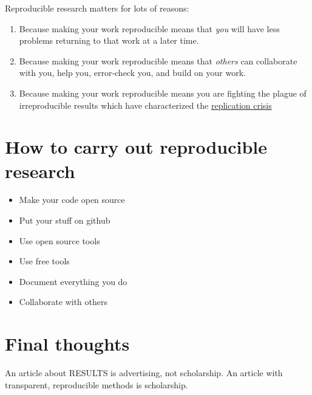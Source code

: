 \documentclass[
]{book}
\providecommand{\tightlist}{%
  \setlength{\itemsep}{0pt}\setlength{\parskip}{0pt}}
\begin{document}
Reproducible research matters for lots of reasons:

\begin{enumerate}
\def\labelenumi{\arabic{enumi}.}
\tightlist
\item
  Because making your work reproducible means that \emph{you} will have less problems returning to that work at a later time.\\
\item
  Because making your work reproducible means that \emph{others} can collaborate with you, help you, error-check you, and build on your work.\\
\item
  Because making your work reproducible means you are fighting the plague of irreproducible results which have characterized the \href{https://en.wikipedia.org/wiki/Replication_crisis}{replication crisis}
\end{enumerate}

\hypertarget{how-to-carry-out-reproducible-research}{%
\section*{How to carry out reproducible research}\label{how-to-carry-out-reproducible-research}}

\begin{itemize}
\tightlist
\item
  Make your code open source\\
\item
  Put your stuff on github\\
\item
  Use open source tools\\
\item
  Use free tools\\
\item
  Document everything you do\\
\item
  Collaborate with others
\end{itemize}

\hypertarget{final-thoughts}{%
\section*{Final thoughts}\label{final-thoughts}}

An article about RESULTS is advertising, not scholarship. An article with transparent, reproducible methods is scholarship.
\end{document}
